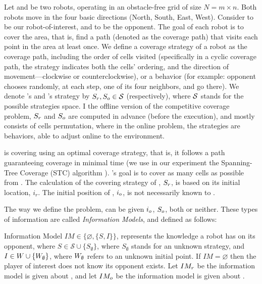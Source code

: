 Let \rob and \opp be two robots, operating in an obstacle-free grid \w of size $N=m \times n$. Both robots move in the four basic directions (North, South, East, West). Consider \rob to be our robot-of-interest, and \opp to be the opponent. 
The goal of each robot is to cover the area, that is, find a path (denoted as the coverage path) that visits  each point in the area at least once. We define a coverage strategy of a robot as the coverage path, including the order of cells visited (specifically in a cyclic coverage path, the strategy indicates both the cells' ordering, and the direction of movement---clockwise or counterclockwise), or a behavior (for example: opponent chooses randomly, at each step, one of its four neighbors, and go there). We denote \rob's and \opp's strategy by $S_r,S_o\in \mathcal{S}$ (respectively), where $\cal{S}$ stands for the possible strategies space. I the offline version of the competitive coverage problem, $S_r$ and $S_o$ are computed in advance (before the execution), and mostly consists of cells permutation, where in the online problem, the strategies are behaviors, able to adjust online to the environment.

\opp is covering \w using an optimal coverage strategy, that is, it follows a path guaranteeing coverage in minimal time (we use in our experiment the Spanning-Tree Coverage (STC) algorithm \cite{gabriely2001spanning}). \rob's goal is to cover as many cells as possible from . The calculation of the covering strategy of \rob, $S_r$, is based on its initial location, $i_r$. The initial position of \opp, $i_o$, is not necessarily known to \rob.

The way we define the problem, \rob can be given $i_o$, $S_o$, both or neither. These types of information are called {\em Information Models}, and defined as follows:
\begin{definition}
Information Model $IM \in \lbrace \varnothing, \lbrace S,I\rbrace \rbrace$, represents the knowledge a robot has on its opponent, where $S\in \mathcal{S} \cup \lbrace S_\emptyset \rbrace$, where $S_\emptyset$ stands for an unknown strategy, and $I \in W \cup \lbrace W_\emptyset \rbrace$, where $W_{\emptyset}$ refers to an unknown initial point. 
If $IM=\varnothing$ then the player of interest does not know its opponent exists.
Let $IM_r$ be the information model \rob is given about \opp, and let $IM_o$ be the information model \opp is given about \rob.
\end{definition}

